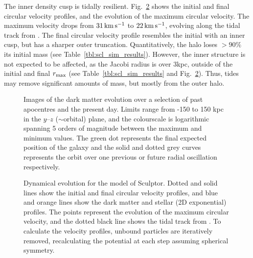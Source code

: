 The inner density cusp is tidally resilient.
Fig.~\ref{fig:scl_tidal_track} shows the initial and final circular
velocity profiles, and the evolution of the maximum circular velocity.
The maximum velocity drops from \(31\,{\rm km\,s^{-1}}\) to \(22\,{\rm km\,s^{-1}}\), evolving
along the tidal track from \citet{EN2021}. The final circular velocity
profile resembles the initial with an inner cusp, but has a sharper
outer truncation. Quantitatively, the halo loses \(>90\%\) its initial
mass (see Table~\ref{tbl:scl_sim_results}). However, the inner structure
is not expected to be affected, as the Jacobi radius is over 3kpc,
outside of the initial and final \(r_{\rm max}\) (see
Table~\ref{tbl:scl_sim_results} and Fig.~\ref{fig:scl_tidal_track}).
Thus, tides may remove significant amounts of mass, but mostly from the
outer halo.

\begin{figure}
\centering
{}
\caption[Sculptor simulation snapshots]{Images of the dark matter
evolution over a selection of past apocentres and the present day.
Limits range from -150 to 150 kpc in the \(y\)--\(z\) (\(\sim\)orbital)
plane, and the colourscale is logarithmic spanning 5 orders of magnitude
between the maximum and minimum values. The green dot represents the
final expected position of the galaxy and the solid and dotted grey
curves represents the orbit over one previous or future radial
oscillation respectively.}\label{fig:scl_sim_images}
\end{figure}

\begin{figure}
\centering
{}
\caption[Sculptor tidal tracks]{Dynamical evolution for the \smallperi{}
model of Sculptor. Dotted and solid lines show the initial and final
circular velocity profiles, and blue and orange lines show the dark
matter and stellar (2D exponential) profiles. The points represent the
evolution of the maximum circular velocity, and the dotted black line
shows the tidal track from \citet{EN2021}. To calculate the velocity
profiles, unbound particles are iteratively removed, recalculating the
potential at each step assuming spherical
symmetry.}\label{fig:scl_tidal_track}
\end{figure}

